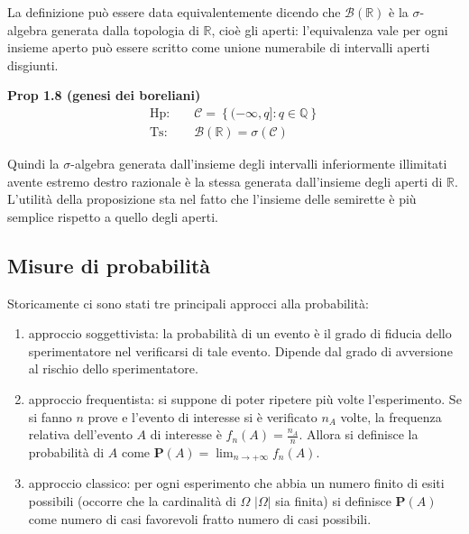 \documentclass{article}
\begin{document}
La definizione pu\`{o} essere data equivalentemente dicendo che $\mathcal{B}%
\left( 
\mathbb{R}
\right) $ \`{e} la $\sigma $-algebra generata dalla topologia di $%
\mathbb{R}
$, cio\`{e} gli aperti: l'equivalenza vale per ogni insieme aperto pu\`{o}
essere scritto come unione numerabile di intervalli aperti disgiunti.

\textbf{Prop 1.8 (genesi dei boreliani) }%
\begin{eqnarray*}
\text{Hp}\text{: } &&\mathcal{C}=\left\{ (-\infty ,q]:q\in 
\mathbb{Q}
\right\} \\
\text{Ts}\text{: } &&\mathcal{B}\left( 
\mathbb{R}
\right) =\sigma \left( \mathcal{C}\right)
\end{eqnarray*}

Quindi la $\sigma $-algebra generata dall'insieme degli intervalli
inferiormente illimitati avente estremo destro razionale \`{e} la stessa
generata dall'insieme degli aperti di $%
\mathbb{R}
$. L'utilit\`{a} della proposizione sta nel fatto che l'insieme delle
semirette \`{e} pi\`{u} semplice rispetto a quello degli aperti.

\subsection{Misure di probabilit\`{a}}

Storicamente ci sono stati tre principali approcci alla probabilit\`{a}:

\begin{enumerate}
\item approccio soggettivista: la probabilit\`{a} di un evento \`{e} il
grado di fiducia dello sperimentatore nel verificarsi di tale evento.
Dipende dal grado di avversione al rischio dello sperimentatore.

\item approccio frequentista: si suppone di poter ripetere pi\`{u} volte
l'esperimento. Se si fanno $n$ prove e l'evento di interesse si \`{e}
verificato $n_{A}$ volte, la frequenza relativa dell'evento $A$ di interesse 
\`{e} $f_{n}\left( A\right) =\frac{n_{A}}{n}$. Allora si definisce la
probabilit\`{a} di $A$ come $\mathbf{P}\left( A\right) =\lim_{n\rightarrow
+\infty }f_{n}\left( A\right) $.

\item approccio classico: per ogni esperimento che abbia un numero finito di
esiti possibili (occorre che la cardinalit\`{a} di $\Omega $ $\left\vert
\Omega \right\vert $ sia finita) si definisce $\mathbf{P}\left( A\right) $
come numero di casi favorevoli fratto numero di casi possibili.
\end{enumerate}
\end{document}
